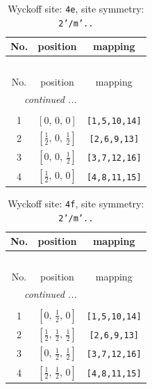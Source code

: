 \documentclass[fleqn,8pt]{jsarticle}
\begin{document}
\renewcommand{\arraystretch}{1.2}
\begin{longtable}{ccc}
\caption{Wyckoff site: {\tt 4e}, site symmetry: {\tt 2'/m'..}}
 \\
 \hline \hline
No. & position & mapping \\ \hline \endfirsthead

\multicolumn{2}{l}{\tablename\ \thetable{}} \\
 \hline \hline
No. & position & mapping \\ \hline \endhead

 \hline \hline
\multicolumn{2}{r}{\footnotesize\it continued ...} \\ \endfoot

 \hline \hline
\multicolumn{2}{r}{} \\ \endlastfoot

1 & $\left[ 0,\, 0,\, 0 \right]$ & {\tt [1,5,10,14]} \\ \hline
2 & $\left[ \frac{1}{2},\, 0,\, \frac{1}{2} \right]$ & {\tt [2,6,9,13]} \\ \hline
3 & $\left[ 0,\, 0,\, \frac{1}{2} \right]$ & {\tt [3,7,12,16]} \\ \hline
4 & $\left[ \frac{1}{2},\, 0,\, 0 \right]$ & {\tt [4,8,11,15]} \\
\end{longtable}
\renewcommand{\arraystretch}{1.2}
\begin{longtable}{ccc}
\caption{Wyckoff site: {\tt 4f}, site symmetry: {\tt 2'/m'..}}
 \\
 \hline \hline
No. & position & mapping \\ \hline \endfirsthead

\multicolumn{2}{l}{\tablename\ \thetable{}} \\
 \hline \hline
No. & position & mapping \\ \hline \endhead

 \hline \hline
\multicolumn{2}{r}{\footnotesize\it continued ...} \\ \endfoot

 \hline \hline
\multicolumn{2}{r}{} \\ \endlastfoot

1 & $\left[ 0,\, \frac{1}{2},\, 0 \right]$ & {\tt [1,5,10,14]} \\ \hline
2 & $\left[ \frac{1}{2},\, \frac{1}{2},\, \frac{1}{2} \right]$ & {\tt [2,6,9,13]} \\ \hline
3 & $\left[ 0,\, \frac{1}{2},\, \frac{1}{2} \right]$ & {\tt [3,7,12,16]} \\ \hline
4 & $\left[ \frac{1}{2},\, \frac{1}{2},\, 0 \right]$ & {\tt [4,8,11,15]} \\
\end{longtable}
\end{document}
